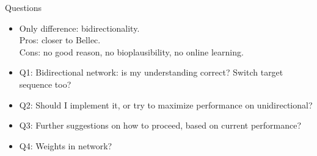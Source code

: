 \documentclass[t]{beamer}
\begin{document}
\begin{frame}{Questions}
	\begin{itemize}[label=--]
	\item Only difference: bidirectionality.\\Pros: closer to Bellec.\\Cons: no good reason, no bioplausibility, no online learning.\\
	\item Q1: Bidirectional network: is my understanding correct? Switch target sequence too?
	\item Q2: Should I implement it, or try to maximize performance on unidirectional?
	\item Q3: Further suggestions on how to proceed, based on current performance?
	\item Q4: Weights in network?
	\end{itemize}
\end{frame}
\end{document}
